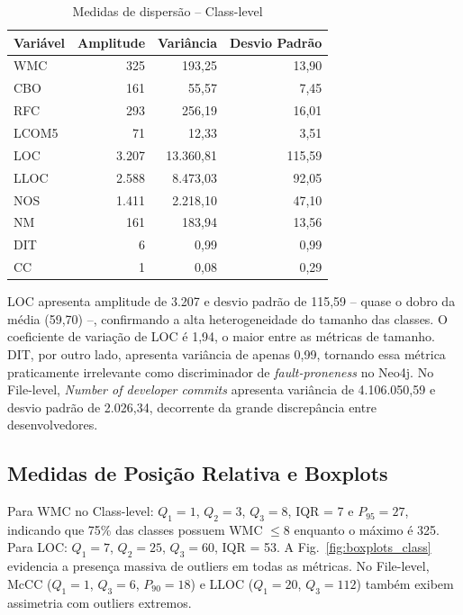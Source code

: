 \documentclass[conference]{IEEEtran}
\begin{document}
\begin{table}[htbp]
\caption{Medidas de dispersão -- Class-level}
\label{tab:dispersao_class}
\centering
\footnotesize
\begin{tabular}{lrrr}
\toprule
\textbf{Variável} & \textbf{Amplitude} & \textbf{Variância} & \textbf{Desvio Padrão} \\
\midrule
WMC   &     325 &      193,25 &  13,90 \\
CBO   &     161 &       55,57 &   7,45 \\
RFC   &     293 &      256,19 &  16,01 \\
LCOM5 &      71 &       12,33 &   3,51 \\
LOC   &   3.207 &   13.360,81 & 115,59 \\
LLOC  &   2.588 &    8.473,03 &  92,05 \\
NOS   &   1.411 &    2.218,10 &  47,10 \\
NM    &     161 &      183,94 &  13,56 \\
DIT   &       6 &        0,99 &   0,99 \\
CC    &       1 &        0,08 &   0,29 \\
\bottomrule
\end{tabular}
\end{table}

LOC apresenta amplitude de 3.207 e desvio padrão de 115,59 -- quase o dobro da média (59,70) --, confirmando a alta heterogeneidade do tamanho das classes. O coeficiente de variação de LOC é 1,94, o maior entre as métricas de tamanho. DIT, por outro lado, apresenta variância de apenas 0,99, tornando essa métrica praticamente irrelevante como discriminador de \textit{fault-proneness} no Neo4j. No File-level, \textit{Number of developer commits} apresenta variância de 4.106.050,59 e desvio padrão de 2.026,34, decorrente da grande discrepância entre desenvolvedores.

\subsection{Medidas de Posição Relativa e Boxplots}

Para WMC no Class-level: $Q_1 = 1$, $Q_2 = 3$, $Q_3 = 8$, IQR = 7 e $P_{95} = 27$, indicando que 75\% das classes possuem WMC $\leq 8$ enquanto o máximo é 325. Para LOC: $Q_1 = 7$, $Q_2 = 25$, $Q_3 = 60$, IQR = 53. A Fig.~\ref{fig:boxplots_class} evidencia a presença massiva de outliers em todas as métricas. No File-level, McCC ($Q_1 = 1$, $Q_3 = 6$, $P_{90} = 18$) e LLOC ($Q_1 = 20$, $Q_3 = 112$) também exibem assimetria com outliers extremos.
\end{document}
